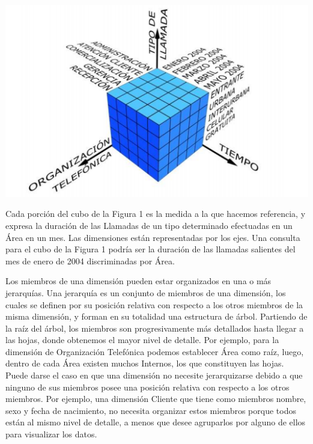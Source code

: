 \begin{center}
\includegraphics{images/BS/imagen 01.png}\newline
\end{center}




Cada porción del cubo de la Figura 1 es la medida a la que hacemos referencia, y expresa la duración de las Llamadas de un tipo determinado efectuadas en un Área en un mes. Las dimensiones están representadas por los ejes. Una consulta para el cubo de la Figura 1 podría ser la duración de las llamadas salientes del mes de enero de 2004 discriminadas por Área. \newline




Los miembros de una dimensión pueden estar organizados en una o más jerarquías. Una jerarquía es un conjunto de miembros de una dimensión, los cuales se definen por su posición relativa con respecto a los otros miembros de la misma dimensión, y forman en su totalidad una estructura de árbol. Partiendo de la raíz del árbol, los miembros son progresivamente más detallados hasta llegar a las hojas, donde obtenemos el mayor nivel de detalle. Por ejemplo, para la dimensión de Organización Telefónica podemos establecer Área como raíz, luego, dentro de cada Área existen muchos Internos, los que constituyen las hojas. Puede darse el caso en que una dimensión no necesite jerarquizarse debido a que ninguno de sus miembros posee una posición relativa con respecto a los otros miembros. Por ejemplo, una dimensión Cliente que tiene como miembros nombre, sexo y fecha de nacimiento, no necesita organizar estos miembros porque todos están al mismo nivel de detalle, a menos que desee agruparlos por alguno de ellos para visualizar los datos. \newline


